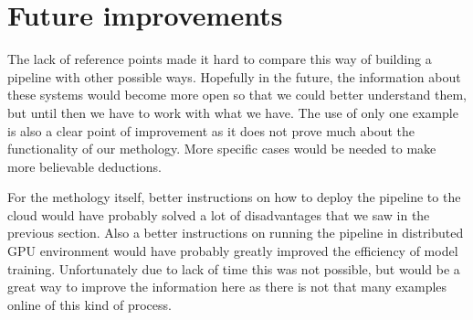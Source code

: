 \section{Future improvements}

The lack of reference points made it hard to compare this way of building a pipeline with other possible ways.
Hopefully in the future, the information about these systems would become more open so that we could better understand them, but until then we have to work with what we have.
The use of only one example is also a clear point of improvement as it does not prove much about the functionality of our methology.
More specific cases would be needed to make more believable deductions.

For the methology itself, better instructions on how to deploy the pipeline to the cloud would have probably solved a lot of disadvantages that we saw in the previous section.
Also a better instructions on running the pipeline in distributed GPU environment would have probably greatly improved the efficiency of model training.
Unfortunately due to lack of time this was not possible, but would be a great way to improve the information here as there is not that many examples online of this kind of process.






